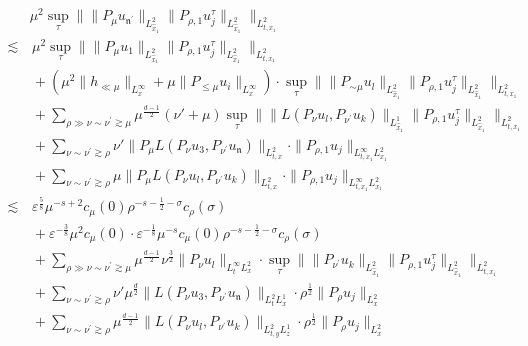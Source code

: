 \documentclass[11pt,letterpaper,reqno]{amsart}
\numberwithin{equation}{section}
\theoremstyle{definition}
\theoremstyle{remark}
\begin{document}
   \begin{align*}
       & \mu^2  \sup_{\tau} \big\| \|P_\mu u_{\mathfrak{n}^\prime}\|_{L^2_{\widehat{x}_1}}  \| P_{\rho,1} u_{j}^{\tau}\|_{L^2_{\widehat{x}_1}}  \big\|_{L^2_{t,x_1}}\nonumber\\
    \lesssim &\,  \mu^2 \sup_{\tau} \big\| \|P_\mu u_{1}\|_{L^2_{\widehat{x}_1}}  \| P_{\rho,1} u_j^\tau\|_{L^2_{\widehat{x}_1}}  \big\|_{L^2_{t,x_1}}\nonumber\\
    &\, +   \left(  \mu^2 \| h_{\ll \mu}  \|_{L^\infty_x}+\mu  \| P_{\leq \mu} u_i\|_{L^\infty_x} \right) \cdot \sup_{\tau} \big\| \|P_{\sim \mu} u_{l}\|_{L^2_{\widehat{x}_1}}  \| P_{\rho,1} u_{j}^{\tau}\|_{L^2_{\widehat{x}_1}}  \big\|_{L^2_{t,x_1}}\\
    &\, + \sum_{\rho \gg \nu \sim \nu^\prime \gtrsim \mu}  \mu^{\frac{d-1}2}  (\nu'+\mu)\sup_{\tau} \big\| \|L(P_{\nu} 
 u_l,P_{\nu^\prime} u_{k})\|_{L^1_{\widehat{x}_1}}  \| P_{\rho,1} u_{j}^{\tau}\|_{L^2_{\widehat{x}_1}}  \big\|_{L^2_{t,x_1}} \\
 &\, +\sum_{ \nu \sim \nu^\prime \gtrsim \rho} \nu' \| P_{\mu} L (P_{\nu} u_3,    P_{\nu^\prime }
u_\mathfrak{n}) \|_{L^2_{t,x}} \cdot \|  P_{\rho,1} u_{j} \|_{L^\infty_{t,x_1}L^2_{x_1} }\\
 &\, +\sum_{ \nu \sim \nu^\prime \gtrsim \rho} \mu \| P_{\mu} L (P_{\nu} u_l,    P_{\nu^\prime }
u_k) \|_{L^2_{t,x}} \cdot \|  P_{\rho,1} u_{j} \|_{L^\infty_{t,x_1}L^2_{x_1} }\\
\lesssim &\, \varepsilon^{\frac58}\mu^{-s+2} c_\mu(0) \rho^{-s-\frac 12 -\sigma} c_\rho(\sigma)\\
&\,+ \varepsilon^{-\frac{3}{8}}    \mu^2 c_\mu(0) \cdot \varepsilon^{-\frac18}  \mu^{-s} c_{\mu}(0) \rho^{-s-\frac 12 -\sigma} c_\rho(\sigma)\\
&\, + \sum_{\rho \gg \nu \sim \nu^\prime \gtrsim \mu}  \mu^{\frac{d-1}2} \nu^{\frac 32}    \| P_{\nu} 
 u_l \|_{L^\infty_t L^2_{x}} \cdot \sup_{\tau} \big\| \| P_{\nu^\prime} u_{k}\|_{L^2_{\widehat{x}_1}}  \| P_{\rho,1} u_{j}^{\tau}\|_{L^2_{\widehat{x}_1}}  \big\|_{L^2_{t,x_1}}  \\
  &\,+ \sum_{  \nu \sim \nu^\prime \gtrsim \rho} \nu'  \mu^{\frac{d}{2}} \|   L (P_{\nu} u_3,    P_{\nu^\prime }
u_\mathfrak{n}) \|_{L^2_{t} L^1_x} \cdot  \rho^{\frac12}\|  P_{\rho} u_{j} \|_{L^2_{x} } \\
 &\,+ \sum_{  \nu \sim \nu^\prime \gtrsim \rho}   \mu^{\frac{d-1}{2}} \|   L (P_{\nu} u_l,    P_{\nu^\prime }
u_k) \|_{L^2_{t,y} L^1_z} \cdot  \rho^{\frac12}\|  P_{\rho} u_{j} \|_{L^2_{x} } \\

\end{align*}
\end{document}
